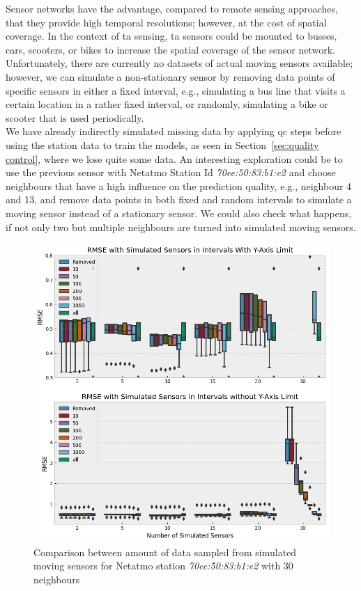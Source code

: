 
Sensor networks have the advantage, compared to remote sensing approaches, that they provide high temporal resolutions; however, at the cost of spatial coverage. In the context of \gls{ta} sensing, \gls{ta} sensors could be mounted to busses, cars, scooters, or bikes to increase the spatial coverage of the sensor network. Unfortunately, there are currently no datasets of actual moving sensors available; however, we can simulate a non-stationary sensor by removing data points of specific sensors in either a fixed interval, e.g., simulating a bus line that visits a certain location in a rather fixed interval, or randomly, simulating a bike or scooter that is used periodically.\\
We have already indirectly simulated missing data by applying \gls{qc} steps before using the station data to train the models, as seen in Section~\ref{sec:quality control}, where we lose quite some data. An interesting exploration could be to use the previous sensor with Netatmo Station Id \textit{70ee:50:83:b1:e2} and choose neighbours that have a high influence on the prediction quality, e.g., neighbour 4 and 13, and remove data points in both fixed and random intervals to simulate a moving sensor instead of a stationary sensor. We could also check what happens, if not only two but multiple neighbours are turned into simulated moving sensors.\\

\begin{figure}[ht]
    \centering
    \includegraphics[width=1\textwidth]{images/eval_moving_sensors_hamburg.png}
    \caption{Comparison between amount of data sampled from simulated moving sensors for Netatmo station \textit{70ee:50:83:b1:e2} with 30 neighbours}
    \label{fig:eval moving sensors}
\end{figure}

